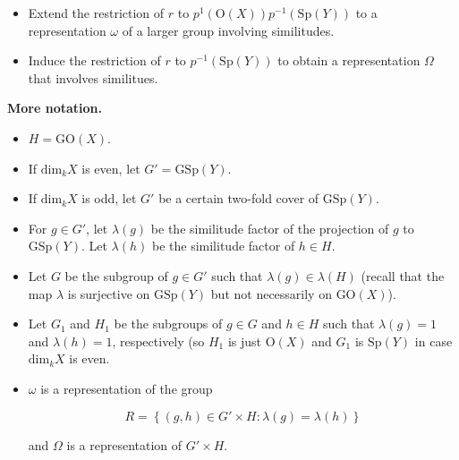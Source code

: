 \documentclass[12pt]{article}
\begin{document}
\begin{itemize}
\item Extend the restriction of $r$ to
$p^{1}\left(\text{O}\left(X\right)\right)p^{-1}\left(\text{Sp}\left(Y\right)\right)$
to a representation $\omega$ of a larger group involving similitudes.
\item Induce the restriction of $r$ to
$p^{-1}\left(\text{Sp}\left(Y\right)\right)$ to obtain a representation $\Omega$
that involves similitues.
\end{itemize}

\textbf{More notation.}

\begin{itemize}

\item $H = \text{GO}\left(X\right)$.

\item If $\text{dim}_{k} X$ is even, let $G' = \text{GSp}\left(Y\right)$.

\item If $\text{dim}_{k} X$ is odd, let $G'$ be a certain two-fold cover of
$\text{GSp}\left(Y\right)$.

\item For $g \in G'$, let $\lambda\left(g\right)$ be the similitude factor of
the projection of $g$ to $\text{GSp}\left(Y\right)$. Let $\lambda\left(h\right)$
be the similitude factor of $h \in H$.

\item Let $G$ be the subgroup of $g \in G'$ such that $\lambda\left(g\right) \in
\lambda\left(H\right)$ (recall that the map $\lambda$ is surjective on
$\text{GSp}\left(Y\right)$ but not necessarily on $\text{GO}\left(X\right)$).

\item Let $G_1$ and $H_1$ be the subgroups of $g \in G$ and $h \in H$ such that
$\lambda\left(g\right) = 1$ and $\lambda\left(h\right) = 1$, respectively (so
$H_{1}$ is just $\text{O}\left(X\right)$ and $G_{1}$ is
$\text{Sp}\left(Y\right)$ in case $\text{dim}_{k} X$ is even.

\item $\omega$ is a representation of the group 

\[R = \left\{\left(g, h\right) \in G' \times H : \lambda\left(g\right) =
\lambda\left(h\right)\right\}\]

and $\Omega$ is a representation of $G' \times H$.

\end{itemize}
\end{document}
